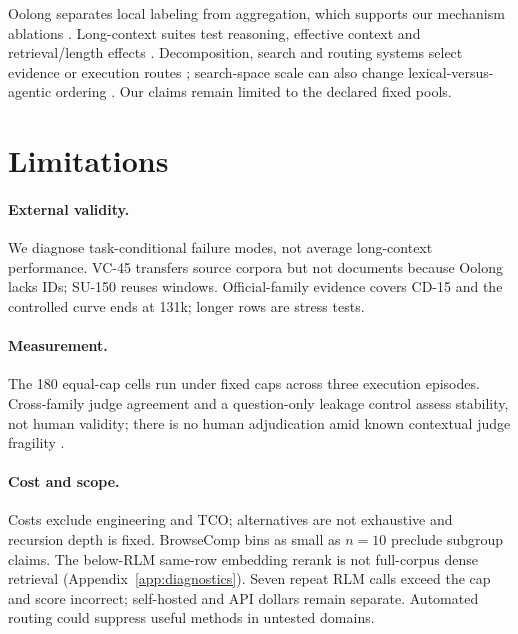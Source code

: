 \documentclass{article}
\begin{document}
Oolong separates local labeling from aggregation, which supports our mechanism ablations \citep{bertsch2025oolong}. Long-context suites test reasoning, effective context and retrieval/length effects \citep{bai2025longbenchv2,longbenchpro2026,hsieh2024ruler,yen2025helmet,zhang2024infinitebench,nolima2025,li2025lara}. Decomposition, search and routing systems select evidence or execution routes \citep{xu2026divideconquer,song2026demystifying,ong2024routellm,li2024selfroute,chen2026preroute}; search-space scale can also change lexical-versus-agentic ordering \citep{wang2026bm25scale}. Our claims remain limited to the declared fixed pools.

\section{Limitations}

\paragraph{External validity.}
We diagnose task-conditional failure modes, not average long-context performance. VC-45 transfers source corpora but not documents because Oolong lacks IDs; SU-150 reuses windows. Official-family evidence covers CD-15 and the controlled curve ends at 131k; longer rows are stress tests.

\paragraph{Measurement.}
The 180 equal-cap cells run under fixed caps across three execution episodes. Cross-family judge agreement and a question-only leakage control assess stability, not human validity; there is no human adjudication amid known contextual judge fragility \citep{tan2025judgebench,xu2025contextualjudgebench}.

\paragraph{Cost and scope.}
Costs exclude engineering and TCO; alternatives are not exhaustive and recursion depth is fixed. BrowseComp bins as small as $n{=}10$ preclude subgroup claims. The below-RLM same-row embedding rerank is not full-corpus dense retrieval (Appendix~\ref{app:diagnostics}). Seven repeat RLM calls exceed the cap and score incorrect; self-hosted and API dollars remain separate. Automated routing could suppress useful methods in untested domains.
\end{document}
